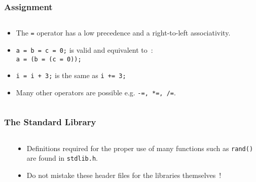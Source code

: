 \begin{frame}[fragile]
\frametitle{Assignment}

\begin{columns}
\begin{column}{0.5\textwidth}
\begin{itemize}[<+->]
\item The \verb$=$ operator has a low precedence
and a right-to-left associativity.
\item  \verb$a = b = c = 0;$ is valid and equivalent to~:\\
\verb$a = (b = (c = 0));$
\item  \verb$i = i + 3;$ is the same as \verb$i += 3;$
\item  Many other operators are possible e.g. \verb$-=, *=, /=$.
\end{itemize}
\end{column}

\pause
\begin{column}{0.5\textwidth}

\end{column}

\end{columns}
\end{frame}

\begin{frame}[fragile]
\frametitle{The Standard Library}
\begin{columns}

\begin{column}{0.60\textwidth}

\end{column}

\pause
\begin{column}{0.35\textwidth}
\begin{itemize}[<+->]
\item Definitions required for the proper use of
many functions such as \verb^rand()^
are found in \verb^stdlib.h^.
\item  Do not mistake these header files for the libraries
themselves~!
\end{itemize}
\end{column}

\end{columns}
\end{frame}
